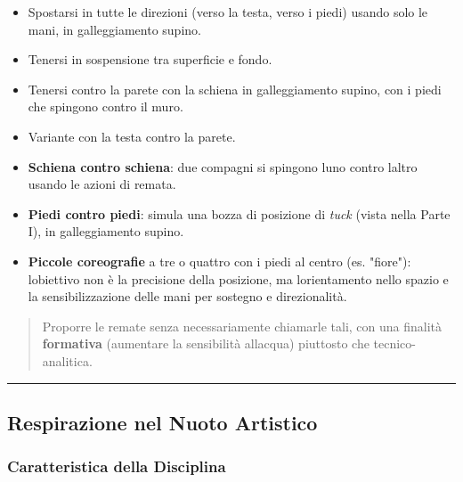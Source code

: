 \documentclass[a4paper,11pt]{article}
\providecommand{\tightlist}{%
  \setlength{\itemsep}{0pt}\setlength{\parskip}{0pt}}
\begin{document}
\begin{itemize}
      \tightlist
      \item
            Spostarsi in tutte le direzioni (verso la testa, verso i piedi) usando
            solo le mani, in galleggiamento supino.
      \item
            Tenersi in sospensione tra superficie e fondo.
      \item
            Tenersi contro la parete con la schiena in galleggiamento supino, con
            i piedi che spingono contro il muro.
      \item
            Variante con la testa contro la parete.
      \item
            \textbf{Schiena contro schiena}: due compagni si spingono
            l\textquotesingle uno contro l\textquotesingle altro usando le azioni
            di remata.
      \item
            \textbf{Piedi contro piedi}: simula una bozza di posizione di
            \emph{tuck} (vista nella Parte I), in galleggiamento supino.
      \item
            \textbf{Piccole coreografie} a tre o quattro con i piedi al centro
            (es. "fiore"): l\textquotesingle obiettivo non è la precisione della
            posizione, ma l\textquotesingle orientamento nello spazio e la
            sensibilizzazione delle mani per sostegno e direzionalità.
\end{itemize}

\begin{quote}
      Proporre le remate senza necessariamente chiamarle tali, con una
      finalità \textbf{formativa} (aumentare la sensibilità
      all\textquotesingle acqua) piuttosto che tecnico-analitica.
\end{quote}

\begin{center}\rule{0.5\linewidth}{0.5pt}\end{center}

\subsection{Respirazione nel Nuoto
      Artistico}\label{respirazione-nel-nuoto-artistico}

\subsubsection{Caratteristica della
      Disciplina}\label{caratteristica-della-disciplina}
\end{document}
